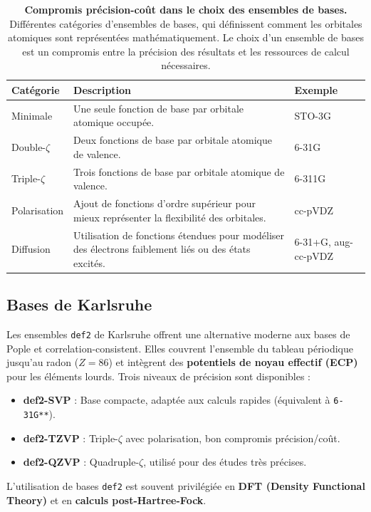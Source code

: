 \documentclass[12pt,a4paper]{article} %
\numberwithin{equation}{section} %
\numberwithin{figure}{section} %
\numberwithin{table}{section} %
\begin{document}
\begin{table}[h!]
    \centering
    \begin{tabular}{|l|p{8cm}|p{3cm}|}
        \hline
        \textbf{Catégorie} & \textbf{Description} & \textbf{Exemple} \\
        \hline
        Minimale & Une seule fonction de base par orbitale atomique occupée. & STO-3G \\
        \hline
        Double-$\zeta$ & Deux fonctions de base par orbitale atomique de valence. & 6-31G \\
        \hline
        Triple-$\zeta$ & Trois fonctions de base par orbitale atomique de valence. & 6-311G \\
        \hline
        Polarisation & Ajout de fonctions d'ordre supérieur pour mieux représenter la flexibilité des orbitales. & cc-pVDZ \\
        \hline
        Diffusion & Utilisation de fonctions étendues pour modéliser des électrons faiblement liés ou des états excités. & 6-31+G, aug-cc-pVDZ \\
        \hline
    \end{tabular}
    \caption{\textbf{Compromis précision-coût dans le choix des ensembles de bases.} Différentes catégories d'ensembles de bases, qui définissent comment les orbitales atomiques sont représentées mathématiquement. Le choix d'un ensemble de bases est un compromis entre la précision des résultats et les ressources de calcul nécessaires.}
    \label{tab:basis_sets}
\end{table}

\subsection{Bases de Karlsruhe}

Les ensembles \texttt{def2} de Karlsruhe offrent une alternative moderne aux bases de Pople et correlation-consistent. Elles couvrent l’ensemble du tableau périodique jusqu’au radon ($Z=86$) et intègrent des
\textbf{potentiels de noyau effectif (ECP)} pour les éléments lourds. Trois niveaux de précision sont disponibles :
\begin{itemize}
    \item \textbf{def2-SVP} : Base compacte, adaptée aux calculs rapides (équivalent à \texttt{6-31G**}).
    \item \textbf{def2-TZVP} : Triple-$\zeta$ avec polarisation, bon compromis précision/coût.
    \item \textbf{def2-QZVP} : Quadruple-$\zeta$, utilisé pour des études très précises.
\end{itemize}
L'utilisation de bases \texttt{def2} est souvent privilégiée en \textbf{DFT (Density Functional Theory)} et en \textbf{calculs post-Hartree-Fock}.
\end{document}
